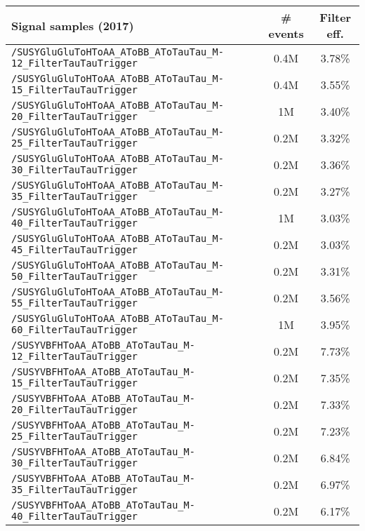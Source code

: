     \begin{table}[ht]
    \begin{center}
    {\scriptsize
    \begin{tabular}{|l|c|c|}
    \hline
    Signal samples (2017) & \# events & Filter eff.\\
    \hline
    \texttt{/SUSYGluGluToHToAA\_AToBB\_AToTauTau\_M-12\_FilterTauTauTrigger} & 0.4M & 3.78\%\\
    \texttt{/SUSYGluGluToHToAA\_AToBB\_AToTauTau\_M-15\_FilterTauTauTrigger} & 0.4M & 3.55\%\\
    \texttt{/SUSYGluGluToHToAA\_AToBB\_AToTauTau\_M-20\_FilterTauTauTrigger} & 1M & 3.40\%\\
    \texttt{/SUSYGluGluToHToAA\_AToBB\_AToTauTau\_M-25\_FilterTauTauTrigger} & 0.2M & 3.32\%\\
    \texttt{/SUSYGluGluToHToAA\_AToBB\_AToTauTau\_M-30\_FilterTauTauTrigger} & 0.2M & 3.36\%\\
    \texttt{/SUSYGluGluToHToAA\_AToBB\_AToTauTau\_M-35\_FilterTauTauTrigger} & 0.2M & 3.27\%\\
    \texttt{/SUSYGluGluToHToAA\_AToBB\_AToTauTau\_M-40\_FilterTauTauTrigger} & 1M & 3.03\%\\
    \texttt{/SUSYGluGluToHToAA\_AToBB\_AToTauTau\_M-45\_FilterTauTauTrigger} & 0.2M & 3.03\%\\
    \texttt{/SUSYGluGluToHToAA\_AToBB\_AToTauTau\_M-50\_FilterTauTauTrigger} & 0.2M & 3.31\%\\
    \texttt{/SUSYGluGluToHToAA\_AToBB\_AToTauTau\_M-55\_FilterTauTauTrigger} & 0.2M & 3.56\%\\
    \texttt{/SUSYGluGluToHToAA\_AToBB\_AToTauTau\_M-60\_FilterTauTauTrigger} & 1M & 3.95\%\\
    \hline
    \texttt{/SUSYVBFHToAA\_AToBB\_AToTauTau\_M-12\_FilterTauTauTrigger} & 0.2M & 7.73\%\\
    \texttt{/SUSYVBFHToAA\_AToBB\_AToTauTau\_M-15\_FilterTauTauTrigger} & 0.2M & 7.35\%\\
    \texttt{/SUSYVBFHToAA\_AToBB\_AToTauTau\_M-20\_FilterTauTauTrigger} & 0.2M & 7.33\%\\
    \texttt{/SUSYVBFHToAA\_AToBB\_AToTauTau\_M-25\_FilterTauTauTrigger} & 0.2M & 7.23\%\\
    \texttt{/SUSYVBFHToAA\_AToBB\_AToTauTau\_M-30\_FilterTauTauTrigger} & 0.2M & 6.84\%\\
    \texttt{/SUSYVBFHToAA\_AToBB\_AToTauTau\_M-35\_FilterTauTauTrigger} & 0.2M & 6.97\%\\
    \texttt{/SUSYVBFHToAA\_AToBB\_AToTauTau\_M-40\_FilterTauTauTrigger} & 0.2M & 6.17\%\\

\end{tabular}}
\end{center}
\end{table}
